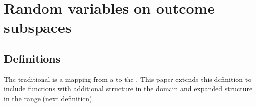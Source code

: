 
\section{Random variables on outcome subspaces}

\subsection{Definitions}
The traditional   is a mapping from a  
to the  .
This paper extends this definition to include functions with additional structure in the domain and 
expanded structure in the range (next definition).
\begin{definition}
\label{def:ocsrv}
\end{definition}

